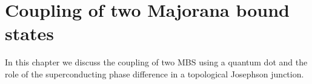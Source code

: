 \chapter{Coupling of two Majorana bound states}

In this chapter we discuss the coupling of two MBS using a quantum dot and the role of the superconducting phase difference in a topological Josephson junction.

